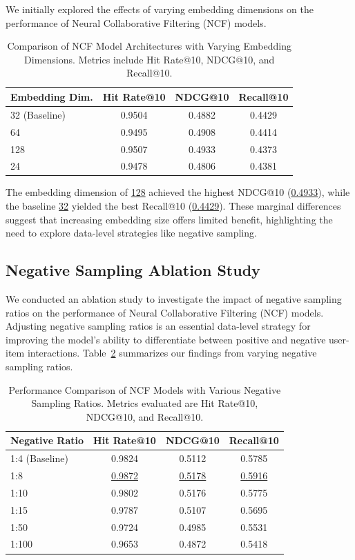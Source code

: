 \documentclass[runningheads]{llncs}
\begin{document}
We initially explored the effects of varying embedding dimensions on the performance of Neural Collaborative Filtering (NCF) models. 

\begin{table}[h!]
\centering
\caption{Comparison of NCF Model Architectures with Varying Embedding Dimensions. Metrics include Hit Rate@10, NDCG@10, and Recall@10.}
\label{tab:results}
\begin{tabular}{lccc}
\toprule
\textbf{Embedding Dim.} & \textbf{Hit Rate@10} & \textbf{NDCG@10} & \textbf{Recall@10} \\
\midrule
32 (Baseline) & 0.9504 & 0.4882 & 0.4429 \\
64 & 0.9495 & 0.4908 & 0.4414 \\
128 & 0.9507 & 0.4933 & 0.4373 \\
24 & 0.9478 & 0.4806 & 0.4381 \\
\bottomrule
\end{tabular}
\end{table}

The embedding dimension of \underline{128} achieved the highest NDCG@10 (\underline{0.4933}), while the baseline \underline{32} yielded the best Recall@10 (\underline{0.4429}). These marginal differences suggest that increasing embedding size offers limited benefit, highlighting the need to explore data-level strategies like negative sampling.

\subsection{Negative Sampling Ablation Study}

We conducted an ablation study to investigate the impact of negative sampling ratios on the performance of Neural Collaborative Filtering (NCF) models. Adjusting negative sampling ratios is an essential data-level strategy for improving the model's ability to differentiate between positive and negative user-item interactions. Table~\ref{tab:negative_sampling_results} summarizes our findings from varying negative sampling ratios.

\begin{table}[h!]
\centering
\caption{Performance Comparison of NCF Models with Various Negative Sampling Ratios. Metrics evaluated are Hit Rate@10, NDCG@10, and Recall@10.}
\label{tab:negative_sampling_results}
\begin{tabular}{lccc}
\toprule
\textbf{Negative Ratio} & \textbf{Hit Rate@10} & \textbf{NDCG@10} & \textbf{Recall@10} \\
\midrule
1:4 (Baseline) & 0.9824 & 0.5112 & 0.5785 \\
1:8 & \underline{0.9872} & \underline{0.5178} & \underline{0.5916} \\
1:10 & 0.9802 & 0.5176 & 0.5775 \\
1:15 & 0.9787 & 0.5107 & 0.5695 \\
1:50 & 0.9724 & 0.4985 & 0.5531 \\
1:100 & 0.9653 & 0.4872 & 0.5418 \\
\bottomrule
\end{tabular}
\end{table}
\end{document}
